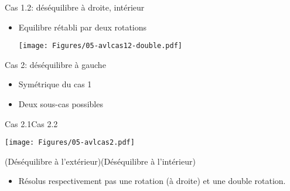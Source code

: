 \begin{frame}{Cas 1.2: déséquilibre à droite, intérieur}
\begin{itemize}
\item Equilibre rétabli par deux rotations

\begin{center}
\texttt{[image: Figures/05-avlcas12-double.pdf]}
\end{center}

\end{itemize}

\end{frame}

\begin{frame}{Cas 2: déséquilibre à gauche}
\begin{itemize}
\item Symétrique du cas 1
\item Deux sous-cas possibles
\end{itemize}

\begin{center}
Cas 2.1\hspace{4cm}Cas 2.2

\medskip

\texttt{[image: Figures/05-avlcas2.pdf]}

\medskip
(Déséquilibre à l'extérieur)\hspace{1.3cm}(Déséquilibre à l'intérieur)
\end{center}

\begin{itemize}
\item Résolus respectivement pas une rotation (à droite) et une double rotation.
\end{itemize}

\end{frame}

